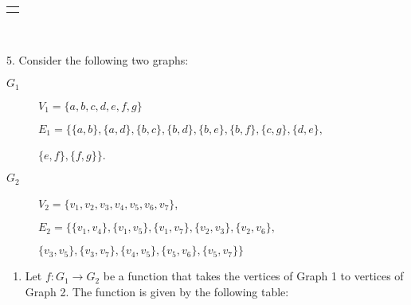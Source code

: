 \documentclass[12pt,]{book}
\theoremstyle{plain}
\theoremstyle{definition}
\theoremstyle{definition}
\theoremstyle{definition}
\numberwithin{equation}{chapter}
\newlength{\panelmax}
\begin{document}
\begin{exerciselist}
{\ifdefined\phAimage\else\newlength{\phAimage}\fi%
\setlength{\phAimage}{\ht\panelboxAimage+\dp\panelboxAimage}
\settototalheight{\phAimage}{\usebox{\panelboxAimage}}
\setlength{\panelmax}{\maxof{\panelmax}{\phAimage}}
\leavevmode%
\setlength{\tabcolsep}{0\linewidth}
\par\medskip\noindent
\hspace*{0.375\linewidth}%
\begin{tabular}{@{}*{1}{c}@{}}
\begin{minipage}[c][\panelmax][t]{0.25\linewidth}\usebox{\panelboxAimage}\end{minipage}\end{tabular}\\
}%
\par\smallskip
\item[5.]\hypertarget{exercise-181}{}\hypertarget{p-1594}{}%
Consider the following two graphs: \leavevmode%
\begin{description}
\item[{\(G_1\)}]\hypertarget{li-718}{}\hypertarget{p-1595}{}%
\(V_1=\{a,b,c,d,e,f,g\}\)%
\par
\hypertarget{p-1596}{}%
\(E_1=\{\{a,b\},\{a,d\},\{b,c\},\{b,d\},\{b,e\},\{b,f\},\{c,g\},\{d,e\},\)%
\par
\hypertarget{p-1597}{}%
\(\{e,f\},\{f,g\}\}\).%
\item[{\(G_2\)}]\hypertarget{li-719}{}\hypertarget{p-1598}{}%
\(V_2=\{v_1,v_2,v_3,v_4,v_5,v_6,v_7\}\),%
\par
\hypertarget{p-1599}{}%
\(E_2=\{\{v_1,v_4\},\{v_1,v_5\},\{v_1,v_7\},\{v_2,v_3\},\{v_2,v_6\},\)%
\par
\hypertarget{p-1600}{}%
\(\{v_3,v_5\},\{v_3,v_7\},\{v_4,v_5\},\{v_5,v_6\},\{v_5,v_7\}\}\)%
\end{description}
%
\par
\hypertarget{p-1601}{}%
\leavevmode%
\begin{enumerate}[label=(\alph*)]
\item\hypertarget{li-720}{}\hypertarget{p-1602}{}%
Let \(f:G_1 \rightarrow G_2\) be a function that takes the vertices of Graph 1 to vertices of Graph 2. The function is given by the following table:%
{%
}
\end{enumerate}
\end{exerciselist}
\end{document}
